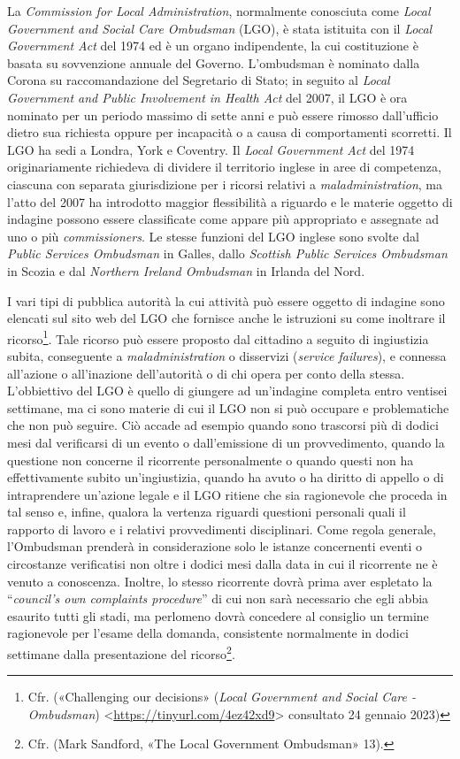 \documentclass[12pt,it,a4paper,]{report}
\begin{document}
La \emph{Commission for Local Administration}, normalmente conosciuta
come \emph{Local Government and Social Care Ombudsman} (LGO), è stata
istituita con il \emph{Local Government Act} del 1974 ed è un organo
indipendente, la cui costituzione è basata su sovvenzione annuale del
Governo. L'ombudsman è nominato dalla Corona su raccomandazione del
Segretario di Stato; in seguito al \emph{Local Government and Public
Involvement in Health Act} del 2007, il LGO è ora nominato per un
periodo massimo di sette anni e può essere rimosso dall'ufficio dietro
sua richiesta oppure per incapacità o a causa di comportamenti
scorretti. Il LGO ha sedi a Londra, York e Coventry. Il \emph{Local
Government Act} del 1974 originariamente richiedeva di dividere il
territorio inglese in aree di competenza, ciascuna con separata
giurisdizione per i ricorsi relativi a \emph{maladministration}, ma
l'atto del 2007 ha introdotto maggior flessibilità a riguardo e le
materie oggetto di indagine possono essere classificate come appare più
appropriato e assegnate ad uno o più \emph{commissioners}. Le stesse
funzioni del LGO inglese sono svolte dal \emph{Public Services
Ombudsman} in Galles, dallo \emph{Scottish Public Services Ombudsman} in
Scozia e dal \emph{Northern Ireland Ombudsman} in Irlanda del Nord.

I vari tipi di pubblica autorità la cui attività può essere oggetto di
indagine sono elencati sul sito web del LGO che fornisce anche le
istruzioni su come inoltrare il ricorso\footnote{Cfr. ({«Challenging our
  decisions»} (\emph{Local Government and Social Care - Ombudsman})
  \textless{}\url{https://tinyurl.com/4ez42xd9}\textgreater{} consultato
  24 gennaio 2023)}. Tale ricorso può essere proposto dal cittadino a
seguito di ingiustizia subita, conseguente a \emph{maladministration} o
disservizi (\emph{service failures}), e connessa all'azione o
all'inazione dell'autorità o di chi opera per conto della stessa.
L'obbiettivo del LGO è quello di giungere ad un'indagine completa entro
ventisei settimane, ma ci sono materie di cui il LGO non si può occupare
e problematiche che non può seguire. Ciò accade ad esempio quando sono
trascorsi più di dodici mesi dal verificarsi di un evento o
dall'emissione di un provvedimento, quando la questione non concerne il
ricorrente personalmente o quando questi non ha effettivamente subito
un'ingiustizia, quando ha avuto o ha diritto di appello o di
intraprendere un'azione legale e il LGO ritiene che sia ragionevole che
proceda in tal senso e, infine, qualora la vertenza riguardi questioni
personali quali il rapporto di lavoro e i relativi provvedimenti
disciplinari. Come regola generale, l'Ombudsman prenderà in
considerazione solo le istanze concernenti eventi o circostanze
verificatisi non oltre i dodici mesi dalla data in cui il ricorrente ne
è venuto a conoscenza. Inoltre, lo stesso ricorrente dovrà prima aver
espletato la ``\emph{council's own complaints procedure}'' di cui non
sarà necessario che egli abbia esaurito tutti gli stadi, ma perlomeno
dovrà concedere al consiglio un termine ragionevole per l'esame della
domanda, consistente normalmente in dodici settimane dalla presentazione
del ricorso\footnote{Cfr. (Mark Sandford, {«The Local Government
  Ombudsman»} 13).}.
\end{document}

